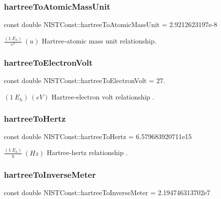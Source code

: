 \subsubsection{\texorpdfstring{hartree\+To\+Atomic\+Mass\+Unit}{hartreeToAtomicMassUnit}}
{\footnotesize\ttfamily const double N\+I\+S\+T\+Const\+::hartree\+To\+Atomic\+Mass\+Unit = 2.\+9212623197e-\/8}

$\frac{(1\ E_h)}{c^2} \ (u)$ Hartree-\/atomic mass unit relationship. \mbox{\label{group___hartree_ga225406ee0c3f44db3c49563e7dd253ce}} 
\subsubsection{\texorpdfstring{hartree\+To\+Electron\+Volt}{hartreeToElectronVolt}}
{\footnotesize\ttfamily const double N\+I\+S\+T\+Const\+::hartree\+To\+Electron\+Volt = 27.}

$(1\ E_h) \ (eV)$ Hartree-\/electron volt relationship . \mbox{\label{group___hartree_gaf2341e65d7aba07555272afe4a14345e}} 
\subsubsection{\texorpdfstring{hartree\+To\+Hertz}{hartreeToHertz}}
{\footnotesize\ttfamily const double N\+I\+S\+T\+Const\+::hartree\+To\+Hertz = 6.\+579683920711e15}

$\frac{(1\ E_h)}{h} \ (Hz)$ Hartree-\/hertz relationship . \mbox{\label{group___hartree_ga98d22d0957c639e03a8432aadd02f58f}} 
\subsubsection{\texorpdfstring{hartree\+To\+Inverse\+Meter}{hartreeToInverseMeter}}
{\footnotesize\ttfamily const double N\+I\+S\+T\+Const\+::hartree\+To\+Inverse\+Meter = 2.\+194746313702e7}

